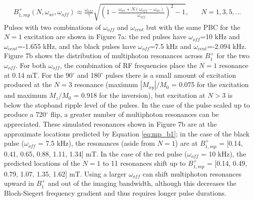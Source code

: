 \documentclass[a4paper,12pt]{article}
\begin{document}
\begin{equation}
\begin{array}{ll}
    B_{1,mp}^+(N,\omega_{av},\omega_{off}) \approx \frac{\omega_{off}}{\gamma} \sqrt{\left(1-\frac{\omega_{av}+ N(\omega_{off} - \omega_{av})}{\omega_{off}}\right)^2-1},  & \quad N = 1, 3, 5, \dots
    \end{array}
    \label{eq:mp_b1}
\end{equation}
Pulses with two combinations of $\omega_{off}$ and $\omega_{cent}$ 
but with the same PBC for the $N=1$ excitation are shown in Figure 7a: 
the red pulses have $\omega_{off}$=10 kHz and $\omega_{cent}$=-1.655 kHz,
and the black pulses have $\omega_{off}$=7.5 kHz and $\omega_{cent}$=-2.094 kHz. 
Figure 7b shows the distribution of multiphoton resonances across $B_1^+$ for the two $\omega_{off}$.
For both $\omega_{off}$, the combination of RF frequencies place the $N=1$ resonance at 0.14 mT. 
For the 90$^\circ$ and 180$^\circ$ pulses there is a small amount of excitation produced at the $N=3$ resonance (maximum $|M_{xy}|/M_0$ = 0.075 for the excitation and maximum $M_z/M_0$ = 0.918 for the inversion), 
but excitation at $N>3$ is below the stopband ripple level of the pulses.
In the case of the pulse scaled up to produce a 720$^\circ$ flip, 
a greater number of multiphoton resonances can be appreciated. 
These simulated resonances shown in Figure 7b are at the approximate locations predicted by Equation \ref{eq:mp_b1}; 
in the case of the black pulse ($\omega_{off}$ = 7.5 kHz), 
the resonances (aside from $N=1$) are at $B_{1,mp}^+$ = [0.14, 0.41, 0.65, 0.88, 1.11, 1.34] mT. 
In the case of the red pulse ($\omega_{off}$ = 10 kHz), 
the predicted locations of the $N=1$ to 11 resonances shift up to $B_{1,mp}^+$ = [0.14, 0.49, 0.79, 1.07, 1.35, 1.62] mT. 
Using a larger $\omega_{off}$ can shift multiphoton resonances upward in $B_1^+$ and out of the imaging bandwidth, 
although this decreases the Bloch-Siegert frequency gradient and thus requires longer pulse durations.
 
\end{document}
